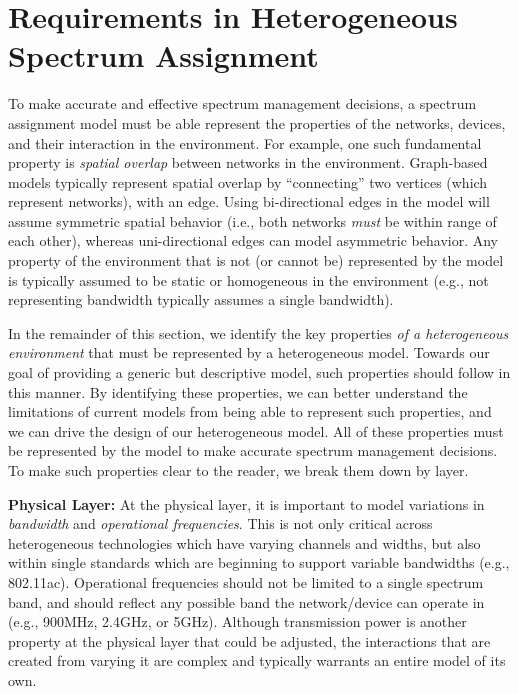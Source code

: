 
\section{Requirements in Heterogeneous Spectrum Assignment}
\label{sec:requirements}


To make accurate and effective spectrum management decisions, a spectrum assignment model must be able represent the properties of the networks, devices, and their interaction in the environment.  For example, one such fundamental property is \emph{spatial overlap} between networks in the environment.  Graph-based models typically represent  spatial overlap by ``connecting'' two vertices (which represent networks), with an edge.  Using bi-directional edges in the model will assume symmetric spatial behavior (i.e., both networks \emph{must} be within range of each other), whereas uni-directional edges can model asymmetric behavior.  Any property of the environment that is not (or cannot be) represented by the model is typically assumed to be static or homogeneous in the environment (e.g., not representing bandwidth typically assumes a single bandwidth).

In the remainder of this section, we identify the key properties \emph{of a heterogeneous environment} that must be represented by a heterogeneous model.  Towards our goal of providing a generic but descriptive model, such properties should follow in this manner.  By identifying these properties, we can better understand the limitations of current models from being able to represent such properties, and we can drive the design of our heterogeneous model.  All of these properties must be represented by the model to make accurate spectrum management decisions.  To make such properties clear to the reader, we break them down by layer.

\smallskip




\textbf{Physical Layer:}  At the physical layer, it is important to model variations in \emph{bandwidth} and \emph{operational frequencies}.  This is not only critical across heterogeneous technologies which have varying channels and widths, but also within single standards which are beginning to support variable bandwidths (e.g., 802.11ac).  Operational frequencies should not be limited to a single spectrum band, and should reflect any possible band the network/device can operate in (e.g., 900MHz, 2.4GHz, or 5GHz).  Although transmission power is another property at the physical layer that could be adjusted, the interactions that are created from varying it are complex and typically warrants an entire model of its own.  

